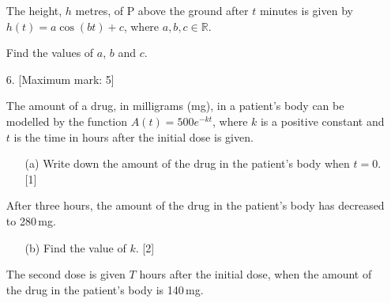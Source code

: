 \documentclass[12pt, twoside]{article}
\begin{document}
\begin{enumerate}[itemsep=0.15cm]
\begin{center}
\end{center}
\vspace{-0.3cm}

The height, $h$ metres, of P above the ground after $t$ minutes is given by
$h(t) = a\cos(bt) + c$, where $a, b, c \in \mathbb{R}$.

Find the values of $a$, $b$ and $c$.


\newpage

\item[6.] [Maximum mark: 5]

The amount of a drug, in milligrams (mg), in a patient's body can be modelled by
the function $A(t) = 500e^{-kt}$, where $k$ is a positive constant and $t$ is the
time in hours after the initial dose is given.

\begin{enumerate}[itemsep=0.1cm]
  \item[(a)] Write down the amount of the drug in the patient's body when $t = 0$. \hfill [1]
\end{enumerate}

After three hours, the amount of the drug in the patient's body has decreased to 280\,mg.

\begin{enumerate}[itemsep=0.1cm]
  \item[(b)] Find the value of $k$. \hfill [2]
\end{enumerate}

The second dose is given $T$ hours after the initial dose, when the amount of the drug
in the patient's body is 140\,mg.


\end{enumerate}
\end{document}

